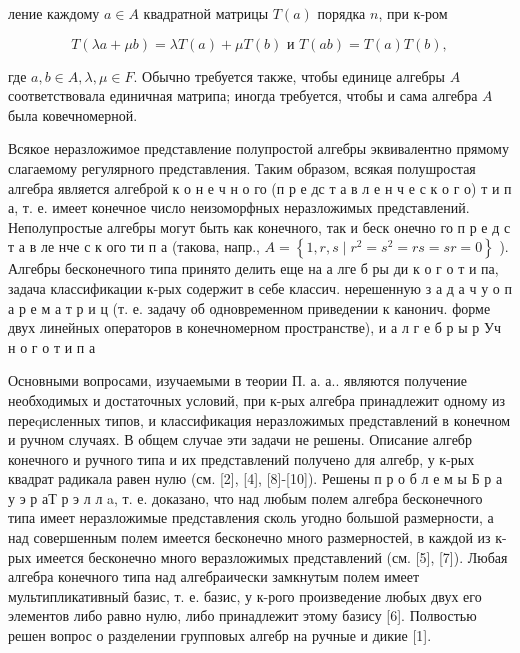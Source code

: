 \documentclass[10pt]{article}
\begin{document}
ление каждому $a \in A$ квадратной матрицы $T(a)$ порядка $n$, при к-ром



\[

T(\lambda a+\mu b)=\lambda T(a)+\mu T(b) \text { и } T(a b)=T(a) T(b),

\]



где $a, b \in A, \lambda, \mu \in F$. Обычно требуется также, чтобы единице алгебры $A$ соответствовала единичная матрипа; иногда требуется, чтобы и сама алгебра $A$ была ковечномерной.



Всякое неразложимое представление полупростой алгебры эквивалентно прямому слагаемому регулярного представления. Таким образом, всякая полушростая алгебра является алгеброй к о н е ч н о го (п р е дс т а в л е н ч е с к о г о) т и п а, т. е. имеет конечное число неизоморфных неразложимых представлений. Неполупростые алгебры могут быть как конечного, так и беск онечно го п р е д с т а в ле нче с к ого ти п а (такова, напр., $A=\left\{1, r, s \mid r^{2}=s^{2}=r s=s r=0\right\}$ ). Алгебры бесконечного типа принято делить еще на а лге б ры ди к о г о т и па, задача классификации к-рых содержит в себе классич. нерешенную з а д а ч у о п а р е м а т р и ц (т. е. задачу об одновременном приведении к канонич. форме двух линейных операторов в конечномерном пространстве), и а л г е б р ы р Уч н о г о т и п а



Основными вопросами, изучаемыми в теории П. а. а.. являются получение необходимых и достаточных условий, при к-рых алгебра принадлежит одному из переqисленных типов, и классификация неразложимых представлений в конечном и ручном случаях. В общем случае эти задачи не решены. Описание алгебр конечного и ручного типа и их представлений получено для алгебр, у к-рых квадрат радикала равен нулю (см. [2], [4], [8]-[10]). Решены п р о б л е м ы Б р а у э р аТ р э л л a, т. е. доказано, что над любым полем алгебра бесконечного типа имеет неразложимые представления сколь угодно большой размерности, а над совершенным полем имеется бесконечно много размерностей, в каждой из к-рых имеется бесконечно много веразложимых представлений (см. [5], [7]). Любая алгебра конечного типа над алгебраически замкнутым полем имеет мультипликативный базис, т. е. базис, у к-рого произведение любых двух его элементов либо равно нулю, либо принадлежит этому базису [6]. Полвостью решен вопрос о разделении групповых алгебр на ручные и дикие [1].
\end{document}
